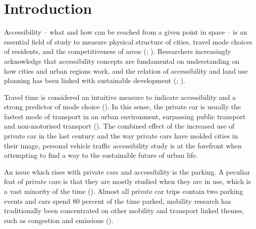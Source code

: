 \section{Introduction}
\justify

Accessibility -- what and how can be reached from a given point in space -- is an essential field of study to measure physical structure of cities, travel mode choices of residents, and the competitiveness of areas (\cite{Bertolini2005}; \cite{Toivonen2014a}). Researchers increasingly acknowledge that accessibility concepts are fundamental on understanding on how cities and urban regions work, and the relation of accessibility and land use planning has been linked with sustainable development (\cite{TeBrommelstroet2014}; \cite{Wegener1999}).

Travel time is considered an intuitive measure to indicate accessibility and a strong predictor of mode choice (\cite{Frank2008}). In this sense, the private car is usually the fastest mode of transport in an urban environment, surpassing public transport and non-motorised transport (\cite{Salonen2014}). The combined effect of the increased use of private car in the last century and the way private cars have molded cities in their image, personal vehicle traffic accessibility study is at the forefront when attempting to find a way to the sustainable future of urban life. 

An issue which rises with private cars and accessibility is the parking. A peculiar feat of private cars is that they are mostly studied when they are in use, which is a vast minority of the time (\cite{Diallo2015}). Almost all private car trips contain two parking events and cars spend 80 percent of the time parked, mobility research has traditionally been concentrated on other mobility and transport linked themes, such as congestion and emissions (\cite{Bates2012}). 

